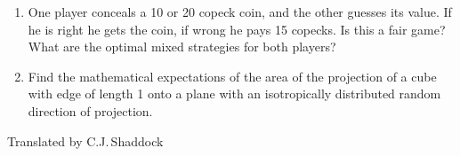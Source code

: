 \documentclass{article}
\begin{document}
\begin{enumerate}
\item One player conceals a 10 or 20 copeck coin, and the other guesses its value. If he is right he gets the coin, if wrong he pays 15 copecks. Is this a fair game? What are the optimal mixed strategies for both players?

\item Find the mathematical expectations of the area of the projection of a cube with edge of length 1 onto a plane with an isotropically distributed random direction of projection.

\end{enumerate}

Translated by C.J.\,Shaddock
\end{document}
